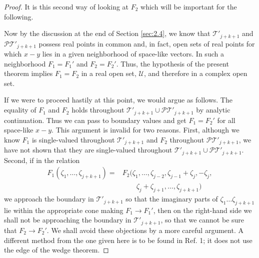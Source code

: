 \begin{proof}
It is this second way of looking at $F_2$ which will be important for the
following.

Now by the discussion at the end of Section \ref{sec:2.4}, we know that
$\mathcal{T}'_{j+k+1}$ and $\mathcal{P}\mathcal{T}'_{j+k+1}$ possess real
points in common and, in fact, open sets of real points for which $x-y$ lies in
a given neighborhood of space-like vectors. In such a neighborhood
$F_1=F_1'$ and $F_2=F_2'$. Thus, the hypothesis of the present theorem implies
$F_1=F_2$ in a real open set, $\mathcal{U}$, and therefore in a complex open
set.

If we were to proceed hastily at this point, we would argue as follows. The
equality of $F_1$ and $F_2$ holds throughout
$\mathcal{T}'_{j+k+1}\cup\mathcal{P}\mathcal{T}'_{j+k+1}$ by analytic
continuation. Thus we can pass to boundary values and get $F_1=F_2'$ for all
space-like $x-y$. This argument is invalid for two reasons. First, although we
know $F_1$ is single-valued throughout $\mathcal{T}'_{j+k+1}$ and $F_2$
throughout $\mathcal{P}\mathcal{T}'_{j+k+1}$, we have not shown that they are
single-valued throughout
$\mathcal{T}'_{j+k+1}\cup\mathcal{P}\mathcal{T}'_{j+k+1}$. Second, if in the
relation
\begin{equation}
\begin{aligned}
 F_1(\zeta_1,\ldots,\zeta_{j+k+1})
 ={}&F_2(\zeta_1,\ldots,\zeta_{j-2},\zeta_{j-1}+\zeta_j,-\zeta_j,\\
 &\qquad\zeta_j+\zeta_{j+1},\ldots,\zeta_{j+k+1})
\end{aligned}
\tag{4-5}\label{eq:ch4-boundary-argument}
\end{equation}
we approach the boundary in $\mathcal{T}'_{j+k+1}$ so that the imaginary parts
of $\zeta_1\ldots\zeta_{j+k+1}$ lie within the appropriate cone making
$F_1\longrightarrow F_1'$, then on the right-hand side we shall not be
approaching the boundary in $\mathcal{T}'_{j+k+1}$, so that we cannot be sure
that $F_2\longrightarrow F_2'$. We shall avoid these objections by a more
careful argument. A different method from the one given here is to be found in
Ref. 1; it does not use the edge of the wedge theorem.


\end{proof}
